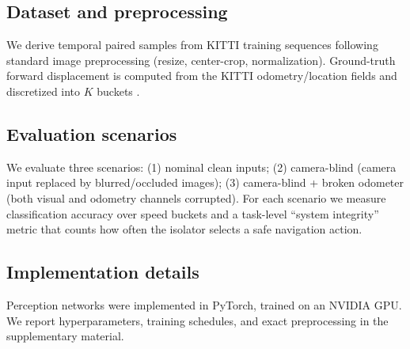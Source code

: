 \subsection{Dataset and preprocessing}
We derive temporal paired samples from KITTI training sequences following standard image preprocessing (resize, center-crop, normalization). Ground-truth forward displacement is computed from the KITTI odometry/location fields and discretized into $K$ buckets \cite{geiger2012kitti}.

\subsection{Evaluation scenarios}
We evaluate three scenarios: (1) nominal clean inputs; (2) camera-blind (camera input replaced by blurred/occluded images); (3) camera-blind + broken odometer (both visual and odometry channels corrupted). For each scenario we measure classification accuracy over speed buckets and a task-level ``system integrity'' metric that counts how often the isolator selects a safe navigation action.

\subsection{Implementation details}
Perception networks were implemented in PyTorch, trained on an NVIDIA GPU. We report hyperparameters, training schedules, and exact preprocessing in the supplementary material.
